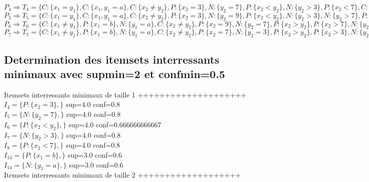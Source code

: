 \documentclass[11pt,a4paper]{article}
\theoremstyle{definition}
\begin{document}
       \noindent $P_{4}\Rightarrow T_{4}=\{C:\{x_{1}=y_{1}\},C:\{x_{1},y_{1}=a\},C:\{x_{2}\neq y_{2}\},P:\{x_{2}=3\},N:\{y_{2}=7\},P:\{x_{2}<y_{2}\},N:\{y_{2}>3\},P:\{x_{2}<7\},C:\{x_{2},y_{2}<9\},\}$ \\
       
       \noindent $P_{5}\Rightarrow T_{5}=\{C:\{x_{1}=y_{1}\},C:\{x_{1},y_{1}=a\},C:\{x_{2}\neq y_{2}\},P:\{x_{2}=3\},N:\{y_{2}=9\},P:\{x_{2}<y_{2}\},N:\{y_{2}>3\},N:\{y_{2}>7\},P:\{x_{2}<7\},P:\{x_{2}<9\},\}$ \\
       
       \noindent $P_{6}\Rightarrow T_{6}=\{C:\{x_{1}\neq y_{1}\},P:\{x_{1}=b\},N:\{y_{1}=a\},C:\{x_{2}\neq y_{2}\},P:\{x_{2}=9\},N:\{y_{2}=7\},P:\{x_{2}>y_{2}\},P:\{x_{2}>7\},N:\{y_{2}<9\},C:\{x_{2},y_{2}>3\},\}$ \\
       
       \noindent $P_{7}\Rightarrow T_{7}=\{C:\{x_{1}\neq y_{1}\},P:\{x_{1}=b\},N:\{y_{1}=a\},C:\{x_{2}\neq y_{2}\},P:\{x_{2}=7\},N:\{y_{2}=3\},P:\{x_{2}>y_{2}\},P:\{x_{2}>3\},N:\{y_{2}<7\},C:\{x_{2},y_{2}<9\},\}$ \\
       
       
      \newpage
      
       \subsection{Determination des itemsets interressants minimaux avec supmin=2 et confmin=0.5}
       
       Itemsets interressants minimaux de taille 1 ++++++++++++++++++++\\
       
       $I_{4}=\{P:\{x_{2}=3\},\}$  sup=4.0 conf=0.8\\
       $I_{5}=\{N:\{y_{2}=7\},\}$  sup=4.0 conf=0.8\\
       $I_{6}=\{P:\{x_{2}<y_{2}\},\}$  sup=4.0 conf=0.666666666667\\
       $I_{7}=\{N:\{y_{2}>3\},\}$  sup=4.0 conf=0.8\\
       $I_{8}=\{P:\{x_{2}<7\},\}$  sup=4.0 conf=0.8\\
       $I_{13}=\{P:\{x_{1}=b\},\}$  sup=3.0 conf=0.6\\
       $I_{14}=\{N:\{y_{1}=a\},\}$  sup=3.0 conf=0.6\\
       
       Itemsets interressants minimaux de taille 2 +++++++++++++++++++\\
       
\end{document}
